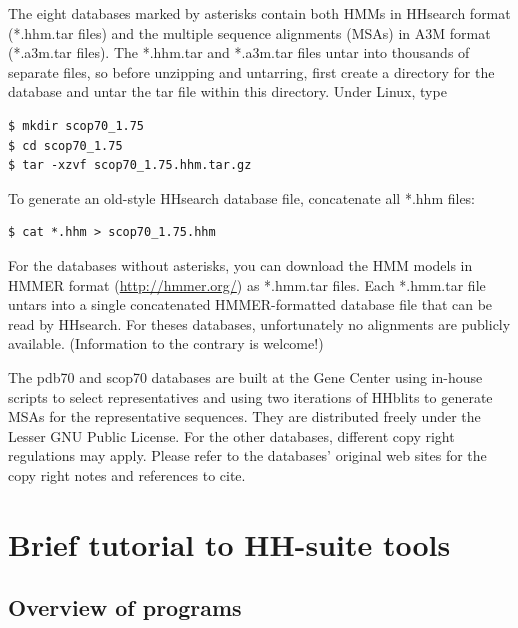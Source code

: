 \documentclass[11pt,a4paper]{article}
\begin{document}
The eight databases marked by asterisks contain both HMMs in HHsearch 
format (*.hhm.tar files) and the multiple sequence alignments (MSAs) in 
A3M format (*.a3m.tar files).  The *.hhm.tar and *.a3m.tar files untar into thousands
of separate files, so before unzipping and untarring, first create a directory for 
the database and untar the tar file within this directory. Under Linux, type
\begin{verbatim}
$ mkdir scop70_1.75
$ cd scop70_1.75
$ tar -xzvf scop70_1.75.hhm.tar.gz
\end{verbatim}

To generate an old-style HHsearch database file, concatenate all *.hhm files:
\begin{verbatim}
$ cat *.hhm > scop70_1.75.hhm
\end{verbatim}
For the databases without asterisks, you can download the HMM models in HMMER format (\url{http://hmmer.org/})
as *.hmm.tar files. Each *.hmm.tar file untars into a single concatenated HMMER-formatted 
database file that can be read by HHsearch. For theses databases, unfortunately no 
alignments are publicly available. (Information to the contrary is welcome!) 

The pdb70 and scop70 databases are built at the Gene Center using in-house scripts 
to select representatives and using two iterations of HHblits to generate MSAs for the 
representative sequences. They are distributed freely under the Lesser GNU Public License. 
For the other databases, different copy right regulations may apply. 
Please refer to the databases' original web sites for the copy right notes and 
references to cite.


\section{Brief tutorial to HH-suite tools}

\subsection{Overview of programs}
\end{document}

